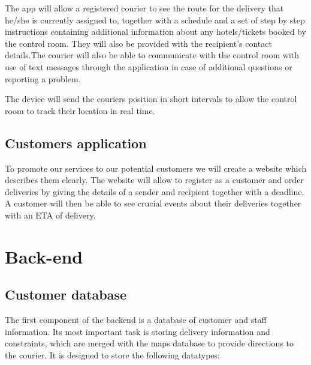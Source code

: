 The app will allow a registered courier to see the route for the delivery that he/she is currently assigned to, together with a schedule and a set of step by step instructions containing additional information about any hotels/tickets booked by the control room. They will also be provided with the recipient's contact details.The courier will also be able to communicate with the control room with use of text messages through the application in case of additional questions or reporting a problem. 

The device will send the couriers position in short intervals to allow the control room to track their location in real time.
\subsection{Customers application} \label{customersarch}
To promote our services to our potential customers we will create a website which describes them clearly. The website will allow to register as a customer and order deliveries by giving the details of a sender and recipient together with a deadline. A customer will then be able to see crucial events about their deliveries together with an ETA of delivery.


\section{Back-end} \label{backendarch}
\subsection{Customer database} \label{databasearch}
The first component of the backend is a database of customer and staff information. Its most important task is storing delivery information and constraints, which are merged with the maps database to provide directions to the courier. It is designed to store the following datatypes:

